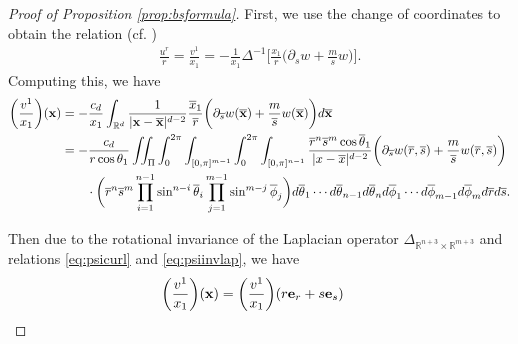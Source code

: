\documentclass[11pt]{amsart}
\theoremstyle{definition}
\theoremstyle{remark}
\numberwithin{equation}{section}
\numberwithin{equation}{section}
\newcommand{\br}[1]{\overline{#1}}
\newcommand{\lap}{\Delta}
\newcommand{\rd}{\partial}
\newcommand{\0}{\emptyset}
\newcommand{\tht}{\theta}
\newcommand{\bfe}{{\bf e}}
\newcommand{\bfx}{{\bf x}}
\newcommand{\bbR}{\mathbb R}
\begin{document}
	\begin{proof}[Proof of Proposition \ref{prop:bsformula}]

		First, we use the change of coordinates to obtain the relation (cf. \cite{JL25})
		\begin{equation}
			\begin{aligned}
				\frac{u^{r}}{r}=\frac{v^{1}}{x_{1}}=-\frac{1}{x_{1}}\lap^{-1}\bigg[\frac{x_{1}}{r}%
				\bigg(\rd_{s}w+\frac{m}{s}w\bigg)\bigg].%
			\end{aligned}
		\end{equation}
		Computing this, we have
		\begin{equation}
			\begin{aligned}
				\bigg(\frac{v^{1}}{x_{1}}\bigg)(\bfx)&=-\frac{c_{d}}{x_{1}}\int_{\bbR^{d}}\frac{1}{|\bfx-\br{\bfx}|^{d-2}}\frac{\br{x}_{1}}{\br{r}}\bigg(\rd_{\br{s}}w(\br{\bfx})+\frac{m}{\br{s}}w(\br{\bfx})\bigg)d\br{\bfx}\\
				&=-\frac{c_{d}}{r\cos\tht_{1}}\iint_{\Pi}\int_{0}^{2\pi}%
				\int_{[0,\pi]^{m-1}}\int_{0}^{2\pi}%
				\int_{[0,\pi]^{n-1}}%
				\frac{\br{r}^{n}\br{s}^{m}\cos\br{\tht}_{1}
				}{|x-\br{x}|^{d-2}}\bigg(\rd_{\br{s}}w(\br{r},\br{s})+\frac{m}{\br{s}}w(\br{r},\br{s})\bigg)\\
				&\qquad\cdot\bigg(\br{r}^{n}\br{s}^{m}\prod_{i=1}^{n-1}\sin^{n-i}\br{\tht}_{i}\prod_{j=1}^{m-1}\sin^{m-j}\br{\phi}_{j}\bigg)d\br{\tht}_{1}\cdots d\br{\tht}_{n-1}d\br{\tht}_{n}d\br{\phi}_{1}\cdots d\br{\phi}_{m-1}d\br{\phi}_{m}d\br{r}d\br{s}.%
			\end{aligned}
		\end{equation}

		Then due to the rotational invariance of the Laplacian operator $\lap_{\bbR^{n+3}\times\bbR^{m+3}}$ and relations \eqref{eq:psicurl} and \eqref{eq:psiinvlap}, we have
		\begin{equation}
			\begin{aligned}
				\bigg(&\frac{v^{1}}{x_{1}}\bigg)(\bfx)=\bigg(\frac{v^{1}}{x_{1}}\bigg)(r\bfe_{r}+s\bfe_{s})%

\end{aligned}
\end{equation}
\end{proof}
\end{document}
